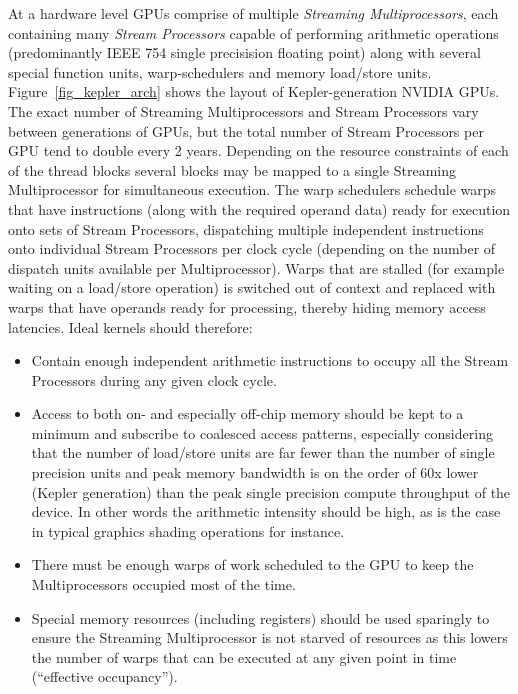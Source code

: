 At a hardware level GPUs comprise of multiple \textit{Streaming Multiprocessors}, each containing many \textit{Stream Processors} capable of performing arithmetic operations (predominantly IEEE 754 single precisision floating point) along
with several special function units, warp-schedulers and memory load/store units. Figure~\ref{fig_kepler_arch} shows the layout of Kepler-generation NVIDIA GPUs. The exact number of Streaming Multiprocessors and Stream Processors
vary between generations of GPUs, but the total number of Stream Processors per GPU tend to double every 2 years. Depending on the resource constraints of each of the thread blocks several blocks may be mapped to a single 
Streaming Multiprocessor for simultaneous execution. The warp schedulers schedule warps that have instructions (along with the required operand data) ready for execution onto sets of Stream Processors, dispatching multiple independent 
instructions onto individual Stream Processors per clock cycle (depending on the number of dispatch units available per Multiprocessor). Warps that are stalled (for example waiting on a load/store operation) is switched out of context
and replaced with warps that have operands ready for processing, thereby hiding memory access latencies. Ideal kernels should therefore:
\begin{itemize}
 \item Contain enough independent arithmetic instructions to occupy all the Stream Processors during
       any given clock cycle.
 \item Access to both on- and especially off-chip memory should be kept to a minimum and subscribe to coalesced access patterns, especially considering that the number of load/store units are far fewer than the number of
       single precision units and peak memory bandwidth is on the order of 60x lower (Kepler generation) than the peak single precision compute throughput of the device. In other words the arithmetic intensity should be high, as
       is the case in typical graphics shading operations for instance.
 \item There must be enough warps of work scheduled to the GPU to keep the Multiprocessors occupied most of the time.
 \item Special memory resources (including registers) should be used sparingly to ensure the Streaming Multiprocessor is not starved of resources as this lowers the number of warps that can be executed at any given point in time 
      (``effective occupancy'').
\end{itemize}

